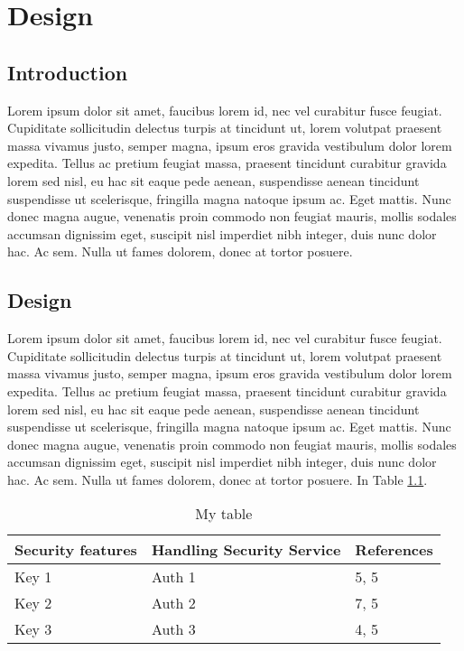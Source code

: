 \chapter{Design}
\section{Introduction}
 Lorem ipsum dolor sit amet, faucibus lorem id, nec vel curabitur fusce feugiat. Cupiditate sollicitudin delectus turpis at tincidunt ut, lorem volutpat praesent massa vivamus justo, semper magna, ipsum eros gravida vestibulum dolor lorem expedita. Tellus ac pretium feugiat massa, praesent tincidunt curabitur gravida lorem sed nisl, eu hac sit eaque pede aenean, suspendisse aenean tincidunt suspendisse ut scelerisque, fringilla magna natoque ipsum ac. Eget mattis. Nunc donec magna augue, venenatis proin commodo non feugiat mauris, mollis sodales accumsan dignissim eget, suscipit nisl imperdiet nibh integer, duis nunc dolor hac. Ac sem. Nulla ut fames dolorem, donec at tortor posuere.
 
 \section{Design}
 
 Lorem ipsum dolor sit amet, faucibus lorem id, nec vel curabitur fusce feugiat. Cupiditate sollicitudin delectus turpis at tincidunt ut, lorem volutpat praesent massa vivamus justo, semper magna, ipsum eros gravida vestibulum dolor lorem expedita. Tellus ac pretium feugiat massa, praesent tincidunt curabitur gravida lorem sed nisl, eu hac sit eaque pede aenean, suspendisse aenean tincidunt suspendisse ut scelerisque, fringilla magna natoque ipsum ac. Eget mattis. Nunc donec magna augue, venenatis proin commodo non feugiat mauris, mollis sodales accumsan dignissim eget, suscipit nisl imperdiet nibh integer, duis nunc dolor hac. Ac sem. Nulla ut fames dolorem, donec at tortor posuere. In Table \ref{tab:tab01}.
 
 
 \begin{table}[]
\begin{tabular}{lll}
Security features     & Handling Security Service & References \\
\hline
Key 1         & Auth 1            & 5, 5  \\  
Key 2         & Auth 2            & 7, 5  \\ 
Key 3         & Auth 3             & 4, 5  \\ 
\end{tabular}\label{tab:tab01}\caption{My table}
\end{table}
  
